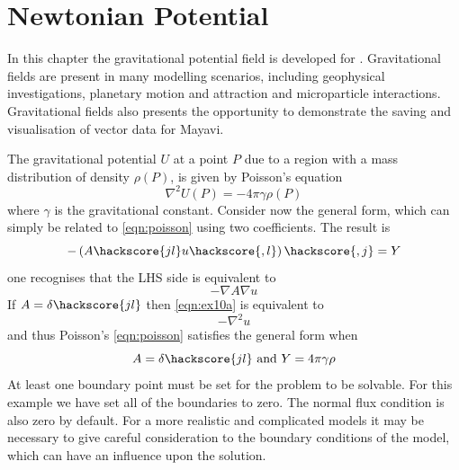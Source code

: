 
%
%
%

\section{Newtonian Potential}

In this chapter the gravitational potential field is developed for \esc.
Gravitational fields are present in many modelling scenarios, including
geophysical investigations, planetary motion and attraction and microparticle
interactions. Gravitational fields also presents the opportunity to demonstrate
the saving and visualisation of vector data for Mayavi.

The gravitational potential $U$ at a point $P$ due to a region with a mass
distribution of density $\rho(P)$, is given by Poisson's equation
\citep{Blakely1995}
\begin{equation} \label{eqn:poisson}
\nabla^2 U(P) = -4\pi\gamma\rho(P)
\end{equation}
where $\gamma$ is the gravitational constant.
Consider now the \esc general form, which can simply be related to
\autoref{eqn:poisson} using two coefficients. The result is
\begin{equation}
-\left(A\hackscore{jl} u\hackscore{,l} \right)\hackscore{,j} = Y
\end{equation}
one recognises that the LHS side is equivalent to 
\begin{equation} \label{eqn:ex10a}
-\nabla A \nabla u
\end{equation}
If $A=\delta\hackscore{jl}$ then \autoref{eqn:ex10a} is equivalent to
\begin{equation*}
-\nabla^2 u
\end{equation*}
and thus Poisson's \autoref{eqn:poisson} satisfies the general form when
\begin{equation}
A=\delta\hackscore{jl} \text{ and } Y= 4\pi\gamma\rho
\end{equation}
At least one boundary point must be set for the problem to be solvable. For this
example we have set all of the boundaries to zero. The normal flux condition is
also zero by default. For a more realistic and complicated models it may be
necessary to give careful consideration to the boundary conditions of the model,
which can have an influence upon the solution.

